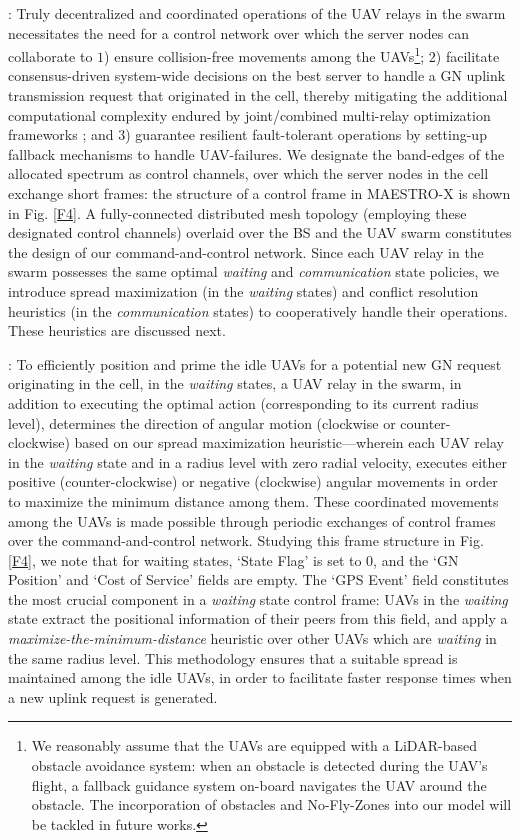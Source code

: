 \documentclass[12pt, draftcls, onecolumn]{IEEEtran}
\theoremstyle{plain}
\theoremstyle{definition}
\theoremstyle{remark}
\begin{document}
: Truly decentralized and coordinated operations of the UAV relays in the swarm necessitates the need for a control network over which the server nodes can collaborate to $1$) ensure collision-free movements among the UAVs\footnote{We reasonably assume that the UAVs are equipped with a LiDAR-based obstacle avoidance system: when an obstacle is detected during the UAV's flight, a fallback guidance system on-board navigates the UAV around the obstacle. The incorporation of obstacles and No-Fly-Zones into our model will be tackled in future works.}; $2$) facilitate consensus-driven system-wide decisions on the best server to handle a GN uplink transmission request that originated in the cell, thereby mitigating the additional computational complexity endured by joint/combined multi-relay optimization frameworks \cite{DDQN, CSCA-ADMM}; and $3$) guarantee resilient fault-tolerant operations by setting-up fallback mechanisms to handle UAV-failures. We designate the band-edges of the allocated spectrum as control channels, over which the server nodes in the cell exchange short frames: the structure of a control frame in MAESTRO-X is shown in Fig. \ref{F4}. A fully-connected distributed mesh topology (employing these designated control channels) overlaid over the BS and the UAV swarm constitutes the design of our command-and-control network. Since each UAV relay in the swarm possesses the same optimal \emph{waiting} and \emph{communication} state policies, we introduce spread maximization (in the \emph{waiting} states) and conflict resolution heuristics (in the \emph{communication} states) to cooperatively handle their operations. These heuristics are discussed next. 

: To efficiently position and prime the idle UAVs for a potential new GN request originating in the cell, in the \emph{waiting} states, a UAV relay in the swarm, in addition to executing the optimal action (corresponding to its current radius level), determines the direction of angular motion (clockwise or counter-clockwise) based on our spread maximization heuristic---wherein each UAV relay in the \emph{waiting} state and in a radius level with zero radial velocity, executes either positive (counter-clockwise) or negative (clockwise) angular movements in order to maximize the minimum distance among them. These coordinated movements among the UAVs is made possible through periodic exchanges of control frames over the command-and-control network. Studying this frame structure in Fig. \ref{F4}, we note that for waiting states, `State Flag' is set to $0$, and the `GN Position' and `Cost of Service' fields are empty. The `GPS Event' field constitutes the most crucial component in a \emph{waiting} state control frame: UAVs in the \emph{waiting} state extract the positional information of their peers from this field, and apply a \emph{maximize-the-minimum-distance} heuristic over other UAVs which are \emph{waiting} in the same radius level. This methodology ensures that a suitable spread is maintained among the idle UAVs, in order to facilitate faster response times when a new uplink request is generated. 
\end{document}
